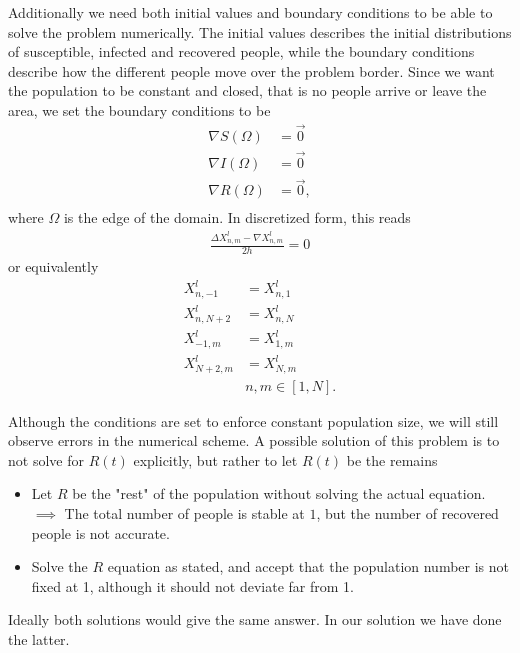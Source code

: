 Additionally we need both initial values and boundary conditions to be able to solve the problem numerically.
The initial values describes the initial distributions of susceptible, infected and recovered people, while
the boundary conditions describe how the different people move over the problem border. Since we want the population to be constant and closed, that is no people arrive or leave
the area, we set the boundary conditions to be
\begin{equation}
    \begin{split}
        \nabla S(\Omega) &= \Vec{0} \\
        \nabla I(\Omega) &= \Vec{0} \\
        \nabla R(\Omega) &= \Vec{0}, \\
    \end{split}
\end{equation}
where $\Omega$ is the edge of the domain. In discretized form, this reads
\begin{equation}
    \begin{split}
        \frac{\Delta X_{n,m}^l - \nabla X_{n,m}^l}{2h} = 0
    \end{split}
\end{equation}
or equivalently
\begin{equation}
    \begin{split}
        X_{n,-1}^l &= X_{n, 1}^l \\
        X_{n,N+2}^l &= X_{n, N}^l \\
        X_{-1,m}^l &= X_{1, m}^l \\
        X_{N+2,m}^l &= X_{N, m}^l \\
        & n,m \in [1, N].
    \end{split}
\end{equation}

Although the conditions are set to enforce constant population size, we will still observe errors in the numerical scheme. A possible solution of this problem is to not 
solve for $R(t)$ explicitly, but rather to let $R(t)$ be the remains
\begin{itemize}
    \item Let $R$ be the "rest" of the population without solving the actual equation. $\implies$ The total number of people is stable at $1$, but the number of recovered people is not accurate.
    \item Solve the $R$ equation as stated, and accept that the population number is not fixed at 1, although it should not deviate far from 1.
\end{itemize}
Ideally both solutions would give the same answer.
In our solution we have done the latter.

